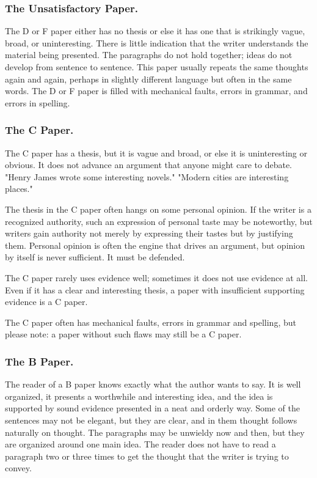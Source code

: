 \documentclass{article}
\begin{document}
\subsubsection{The Unsatisfactory Paper.}
The D or F paper either has no thesis or else it has one that is strikingly vague, broad, or uninteresting. There is little indication that the writer understands the material being presented. The paragraphs do not hold together; ideas do not develop from sentence to sentence. This paper usually repeats the same thoughts again and again, perhaps in slightly different language but often in the same words. The D or F paper is filled with mechanical faults, errors in grammar, and errors in spelling.

\subsubsection{The C Paper.}
The C paper has a thesis, but it is vague and broad, or else it is uninteresting or obvious. It does not advance an argument that anyone might care to debate. "Henry James wrote some interesting novels." "Modern cities are interesting places."

The thesis in the C paper often hangs on some personal opinion. If the writer is a recognized authority, such an expression of personal taste may be noteworthy, but writers gain authority not merely by expressing their tastes but by justifying them. Personal opinion is often the engine that drives an argument, but opinion by itself is never sufficient. It must be defended.

The C paper rarely uses evidence well; sometimes it does not use evidence at all. Even if it has a clear and interesting thesis, a paper with insufficient supporting evidence is a C paper.

The C paper often has mechanical faults, errors in grammar and spelling, but please note: a paper without such flaws may still be a C paper.

\subsubsection{The B Paper.}
The reader of a B paper knows exactly what the author wants to say. It is well organized, it presents a worthwhile and interesting idea, and the idea is supported by sound evidence presented in a neat and orderly way. Some of the sentences may not be elegant, but they are clear, and in them thought follows naturally on thought. The paragraphs may be unwieldy now and then, but they are organized around one main idea. The reader does not have to read a paragraph two or three times to get the thought that the writer is trying to convey.
\end{document}
